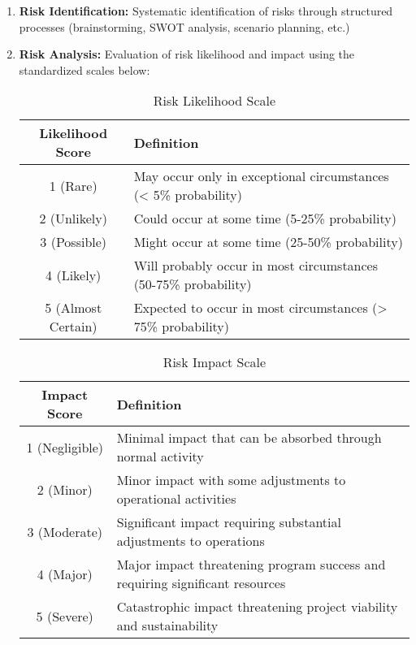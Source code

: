 \begin{enumerate}
    \item \textbf{Risk Identification:} Systematic identification of risks through structured processes (brainstorming, SWOT analysis, scenario planning, etc.)
    
    \item \textbf{Risk Analysis:} Evaluation of risk likelihood and impact using the standardized scales below:
    
    \begin{table}[h]
    \centering
    \begin{tabular}{|c|p{10cm}|}
    \hline
    \textbf{Likelihood Score} & \textbf{Definition} \\
    \hline
    1 (Rare) & May occur only in exceptional circumstances (< 5\% probability) \\
    \hline
    2 (Unlikely) & Could occur at some time (5-25\% probability) \\
    \hline
    3 (Possible) & Might occur at some time (25-50\% probability) \\
    \hline
    4 (Likely) & Will probably occur in most circumstances (50-75\% probability) \\
    \hline
    5 (Almost Certain) & Expected to occur in most circumstances (> 75\% probability) \\
    \hline
    \end{tabular}
    \caption{Risk Likelihood Scale}
    \end{table}
    
    \begin{table}[h]
    \centering
    \begin{tabular}{|c|p{10cm}|}
    \hline
    \textbf{Impact Score} & \textbf{Definition} \\
    \hline
    1 (Negligible) & Minimal impact that can be absorbed through normal activity \\
    \hline
    2 (Minor) & Minor impact with some adjustments to operational activities \\
    \hline
    3 (Moderate) & Significant impact requiring substantial adjustments to operations \\
    \hline
    4 (Major) & Major impact threatening program success and requiring significant resources \\
    \hline
    5 (Severe) & Catastrophic impact threatening project viability and sustainability \\
    \hline
    \end{tabular}
    \caption{Risk Impact Scale}
    \end{table}
    

\end{enumerate}
